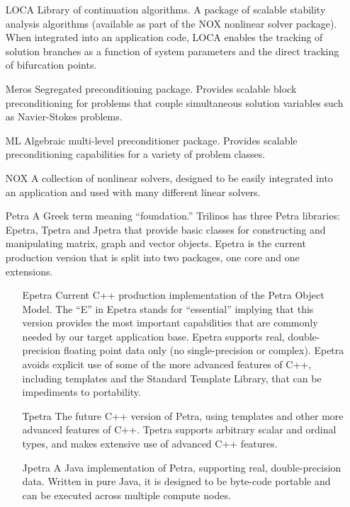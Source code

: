 \begin{itemize}
\item[LOCA]
Library of continuation algorithms. A package of scalable stability 
analysis algorithms (available as part of 
the NOX nonlinear solver package). When integrated into an application code, 
LOCA enables the tracking of solution branches as a function of system 
parameters and the direct tracking of bifurcation points.

\item[Meros]
Segregated preconditioning package.  Provides scalable block
preconditioning for problems that couple simultaneous solution
variables such as Navier-Stokes problems. 

\item[ML]
Algebraic multi-level preconditioner package.  Provides scalable
preconditioning capabilities for a variety of problem classes.  

\item[NOX]
A collection of nonlinear solvers, designed to be easily integrated
into an application and used with many different linear solvers.

\item[Petra]
A Greek term meaning ``foundation.''  Trilinos has three Petra 
libraries: Epetra, Tpetra and Jpetra that provide basic classes 
for constructing and manipulating matrix, graph and vector
objects.  Epetra is the current production version that is
split into two packages, one core and one extensions.

\begin{itemize}

\item[Epetra] Current C++ production implementation of the Petra
Object Model.  The ``E'' in Epetra stands for ``essential'' implying
that this version provides the most important capabilities that are
commonly needed by our target application base.  Epetra supports real,
double-precision floating point data only (no single-precision or
complex).  Epetra avoids explicit use of some of the more
advanced features of C++, including templates and the Standard
Template Library, that can be impediments to portability.

\item[Tpetra] The future C++ version of Petra, using templates and
other more advanced features of C++.  Tpetra supports arbitrary scalar
and ordinal types, and makes extensive use of advanced C++ features.

\item[Jpetra] A Java implementation of Petra, supporting real,
double-precision data.  Written in pure Java, it is designed to be
byte-code portable and can be executed across multiple compute nodes.


\end{itemize}
\end{itemize}
